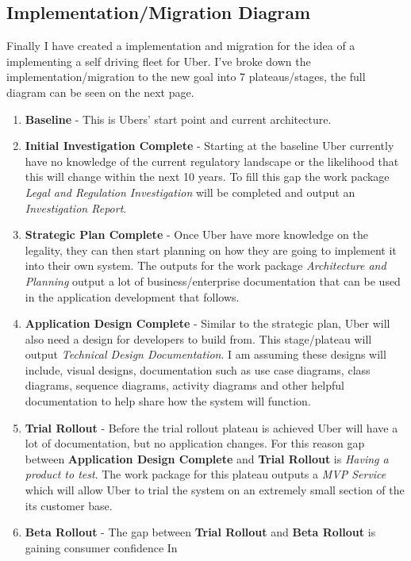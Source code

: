 \documentclass{article}
\begin{document}
    \newpage

    \subsection{Implementation/Migration Diagram}
    Finally I have created a implementation and migration for the idea of a implementing a self driving fleet for Uber.
    I've broke down the implementation/migration to the new goal into 7 plateaus/stages, the full diagram can be seen on the next page.

    \begin{enumerate}
      \item \textbf{Baseline} - This is Ubers' start point and current architecture.
      \item \textbf{Initial Investigation Complete} - Starting at the baseline Uber currently have no knowledge of the current regulatory landscape or the
      likelihood that this will change within the next 10 years. To fill this gap the work package \textit{Legal and Regulation Investigation}
      will be completed and output an \textit{Investigation Report}.
      \item \textbf{Strategic Plan Complete} - Once Uber have more knowledge on the legality, they can then start planning on how
            they are going to implement it into their own system. The outputs for the work package \textit{Architecture and Planning}
            output a lot of business/enterprise documentation that can be used in the application development that follows.
      \item \textbf{Application Design Complete} - Similar to the strategic plan, Uber will also need a design for developers to build from. This stage/plateau
            will output \textit{Technical Design Documentation}. I am assuming these designs will include, visual designs, documentation such as use case diagrams,
            class diagrams, sequence diagrams, activity diagrams and other helpful documentation to help share how the system will function.
      \item \textbf{Trial Rollout} - Before the trial rollout plateau is achieved Uber will have a lot of documentation, but no application changes. For this reason 
            gap between \textbf{Application Design Complete} and \textbf{Trial Rollout} is \textit{Having a product to test}. The work package for this plateau outputs
            a \textit{MVP Service} which will allow Uber to trial the system on an extremely small section of the its customer base.
      \item \textbf{Beta Rollout} - The gap between \textbf{Trial Rollout} and \textbf{Beta Rollout} is gaining consumer confidence In

\end{enumerate}
\end{document}
